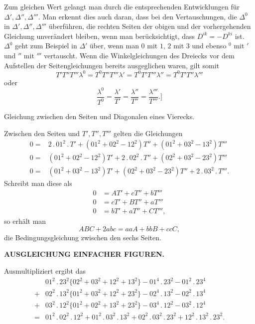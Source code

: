 Zum gleichen Wert gelangt man durch die entsprechenden Entwicklungen für \(\Delta',\Delta'',\Delta'''\). Man erkennt dies auch daran, dass bei den Vertauschungen, die \(\Delta^0\) in \(\Delta',\Delta'',\Delta'''\) überführen, die rechten Seiten der obigen und der vorhergehenden Gleichung unverändert bleiben, wenn man berücksichtigt, dass \(D^{ik}=-D^{ki}\) ist. \(\Delta^0\) geht zum Beispiel in \(\Delta'\) über, wenn man \(0\) mit \(1\), \(2\) mit \(3\) und ebenso \({}^0\) mit \({}'\) und \({}''\) mit \({}'''\) vertauscht. Wenn die Winkelgleichungen des Dreiecks vor dem Aufstellen der Seitengleichungen bereits ausgeglichen waren, gilt somit
\[
 T'T''T'''\lambda^0=T^0T''T'''\lambda'=T^0T'T'''\lambda''=T^0T'T''\lambda'''
\]
\noindent oder
\[
 \frac{\lambda^0}{T^0}=\frac{\lambda'}{T'}=\frac{\lambda''}{T''}=\frac{\lambda'''}{T'''}.\biggr]
\]

\medskip
{\centering
[2.]\par\smallskip
Gleichung zwischen den Seiten und Diagonalen eines Vierecks.\par}
Zwischen den Seiten und \(T',T'',T'''\) gelten die Gleichungen
\[
\begin{aligned}
 0={}&2\,.\,01^2\,.\,T'+(01^2+02^2-12^2)T''+(01^2+03^2-13^2)T'''\\
 0={}&(01^2+02^2-12^2)T'+2\,.\,02^2\,.\,T''+(02^2+03^2-23^2)T'''\\
 0={}&(01^2+03^2-13^2)T'+(02^2+03^2-23^2)T''+2\,.\,03^2\,.\,T'''.
\end{aligned}
\]
Schreibt man diese als
\[
\begin{aligned}
 0&=AT'+cT''+bT'''\\
 0&=cT'+BT''+aT'''\\
 0&=bT'+aT''+CT''',
\end{aligned}
\]
\noindent so erhält man
\[
 ABC+2abc=aaA+bbB+ccC,
\]
\noindent die Bedingungsgleichung zwischen den sechs Seiten.

\par\clearpage
\noindent\null\hfill{\small\textbf{AUSGLEICHUNG EINFACHER FIGUREN.}}\hfill{}\par\medskip

Ausmultipliziert ergibt das
\[
\begin{aligned}
 &01^2\,.\,23^2\{02^2+03^2+12^2+13^2\}-01^4\,.\,23^2-01^2\,.\,23^4\\
 +{}&02^2\,.\,13^2\{01^2+03^2+12^2+23^2\}-02^4\,.\,13^2-02^2\,.\,13^4\\
 +{}&03^2\,.\,12^2\{01^2+02^2+13^2+23^2\}-03^4\,.\,12^2-03^2\,.\,12^4\\
 ={}&01^2\,.\,02^2\,.\,12^2+01^2\,.\,03^2\,.\,13^2+02^2\,.\,03^2\,.\,23^2+12^2\,.\,13^2\,.\,23^2.
\end{aligned}
\]

